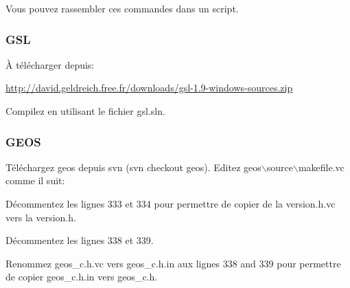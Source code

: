 Vous pouvez rassembler ces commandes dans un script.

% 
% 

\subsubsection{GSL}
À télécharger depuis:

\url{http://david.geldreich.free.fr/downloads/gsl-1.9-windows-sources.zip}

Compilez en utilisant le fichier gsl.sln.

% 
% 
% 
% 
% 
% 

\subsubsection{GEOS}
Téléchargez geos depuis svn (svn checkout  geos).
Editez geos$\backslash$source$\backslash$makefile.vc comme il suit:

Décommentez les lignes 333 et 334 pour permettre de copier de la version.h.vc vers la version.h.

Décommentez les lignes 338 et 339.

Renommez geos\_c.h.vc vers geos\_c.h.in aux lignes 338 and 339 pour permettre de copier geos\_c.h.in vers geos\_c.h.

